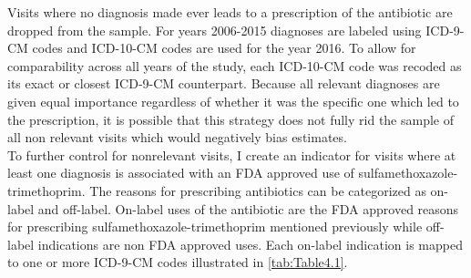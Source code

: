 \indent Visits where no diagnosis made ever leads to a prescription of the antibiotic are dropped from the sample. For years 2006-2015 diagnoses are labeled using ICD-9-CM codes and ICD-10-CM codes are used for the year 2016. To allow for comparability across all years of the study, each ICD-10-CM code was recoded as its exact or closest ICD-9-CM counterpart. Because all relevant diagnoses are given equal importance regardless of whether it was the specific one which led to the prescription, it is possible that this strategy does not fully rid the sample of all non relevant visits which would negatively bias estimates.\\
\indent To further control for nonrelevant visits, I create an indicator for visits where at least one diagnosis is associated with an FDA approved use of sulfamethoxazole-trimethoprim. The reasons for prescribing antibiotics can be categorized as on-label and off-label. On-label uses of the antibiotic are the FDA approved reasons for prescribing sulfamethoxazole-trimethoprim mentioned previously while off-label indications are non FDA approved uses. Each on-label indication is mapped to one or more ICD-9-CM codes illustrated in \autoref{tab:Table4.1}.

